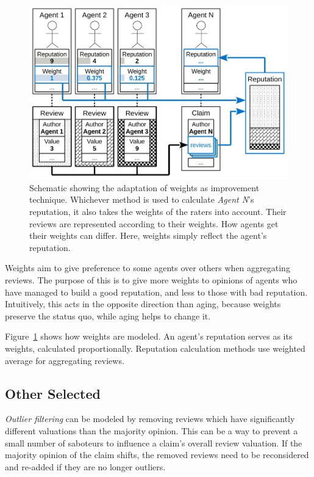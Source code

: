 \documentclass[%
    ]{\PathToTumTemplate/thesis/tum_thesis}
\begin{document}
\begin{figure}[tbp]
  \begin{center}
        \includegraphics[width=0.85\linewidth]	{../images/improvement_weights-crop.pdf}
    \caption{
    Schematic showing the adaptation of weights as improvement technique.
    Whichever method is used to calculate \emph{Agent N}'s reputation, it also takes the weights of the raters into account.
    Their reviews are represented according to their weights.
    How agents get their weights can differ.
    Here, weights simply reflect the agent's reputation.
    }
    \label{fig:improvement_weights}
  \end{center}
\end{figure}

Weights aim to give preference to some agents over others when aggregating reviews.
The purpose of this is to give more weights to opinions of agents who have managed to build a good reputation, and less to those with bad reputation.
Intuitively, this acts in the opposite direction than aging, because weights preserve the status quo, while aging helps to change it.

Figure~\ref{fig:improvement_weights} shows how weights are modeled.
An agent's reputation serves as its weights, calculated proportionally.
Reputation calculation methods use weighted average for aggregating reviews.


\subsection{Other Selected}

\emph{Outlier filtering} can be modeled by removing reviews which have significantly different valuations than the majority opinion.
This can be a way to prevent a small number of saboteurs to influence a claim's overall review valuation.
If the majority opinion of the claim shifts, the removed reviews need to be reconsidered and re-added if they are no longer outliers.
\end{document}

